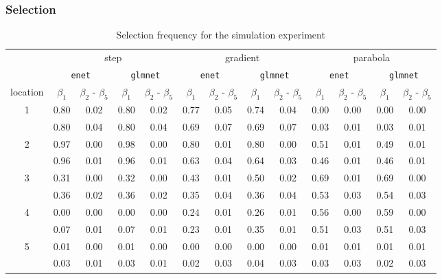 \documentclass[authoryear, review, 11pt]{elsarticle}
\begin{document}
\subsubsection{Selection}
\begin{table}
\thispagestyle{empty}
\begin{center}
\setlength\tabcolsep{4pt}	
\begin{tabular}{ccc|cc|cc|cc|cc|cc}
& \multicolumn{4}{c}{step} & \multicolumn{4}{|c|}{gradient} & \multicolumn{4}{c}{parabola} \\
& \multicolumn{2}{c}{\texttt{enet}} & \multicolumn{2}{c|}{\texttt{glmnet}} & \multicolumn{2}{c}{\texttt{enet}} & \multicolumn{2}{c|}{\texttt{glmnet}}  & \multicolumn{2}{c}{\texttt{enet}} & \multicolumn{2}{c}{\texttt{glmnet}} \\
location & $\beta_1$ & $\beta_2$ - $\beta_5$ & $\beta_1$ & $\beta_2$ - $\beta_5$ & $\beta_1$ & $\beta_2$ - $\beta_5$ & $\beta_1$ & $\beta_2$ - $\beta_5$ & $\beta_1$ & $\beta_2$ - $\beta_5$ & $\beta_1$ & $\beta_2$ - $\beta_5$ \\ 
   \hline
   \multirow{2}{*}{1} & 0.80 & 0.02 & 0.80 & 0.02 & 0.77 & 0.05 & 0.74 & 0.04 & 0.00 & 0.00 & 0.00 & 0.00 \\ 
   & 0.80 & 0.04 & 0.80 & 0.04 & 0.69 & 0.07 & 0.69 & 0.07 & 0.03 & 0.01 & 0.03 & 0.01 \\ 
   \cline{2-13}
   \multirow{2}{*}{2} & 0.97 & 0.00 & 0.98 & 0.00 & 0.80 & 0.01 & 0.80 & 0.00 & 0.51 & 0.01 & 0.49 & 0.01 \\ 
   & 0.96 & 0.01 & 0.96 & 0.01 & 0.63 & 0.04 & 0.64 & 0.03 & 0.46 & 0.01 & 0.46 & 0.01 \\ 
   \cline{2-13}
   \multirow{2}{*}{3} & 0.31 & 0.00 & 0.32 & 0.00 & 0.43 & 0.01 & 0.50 & 0.02 & 0.69 & 0.01 & 0.69 & 0.00 \\ 
   & 0.36 & 0.02 & 0.36 & 0.02 & 0.35 & 0.04 & 0.36 & 0.04 & 0.53 & 0.03 & 0.54 & 0.03 \\ 
   \cline{2-13}
   \multirow{2}{*}{4} & 0.00 & 0.00 & 0.00 & 0.00 & 0.24 & 0.01 & 0.26 & 0.01 & 0.56 & 0.00 & 0.59 & 0.00 \\ 
   & 0.07 & 0.01 & 0.07 & 0.01 & 0.23 & 0.01 & 0.35 & 0.01 & 0.51 & 0.03 & 0.51 & 0.03 \\ 
   \cline{2-13}
   \multirow{2}{*}{5} & 0.01 & 0.00 & 0.01 & 0.00 & 0.00 & 0.00 & 0.00 & 0.00 & 0.01 & 0.01 & 0.01 & 0.01 \\ 
   & 0.03 & 0.01 & 0.03 & 0.01 & 0.02 & 0.03 & 0.04 & 0.03 & 0.03 & 0.03 & 0.02 & 0.03 \\ 
  \end{tabular}
\caption{Selection frequency for the simulation experiment\label{table:selection}}
\end{center}
\end{table}
		
\end{document}
